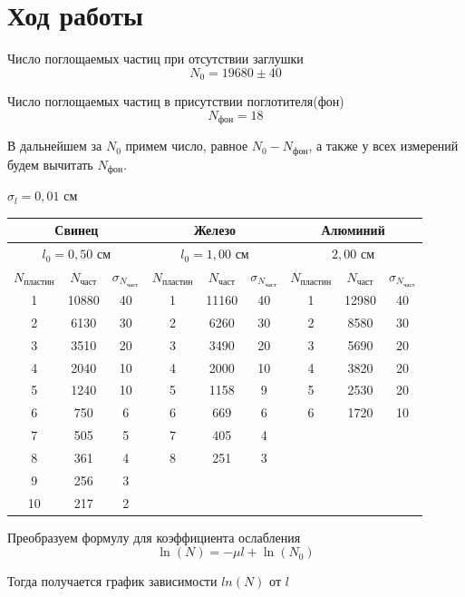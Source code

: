 \documentclass[a4paper,12pt]{article}
\begin{document}
\section*{Ход работы}
Число поглощаемых частиц при отсутствии заглушки
\[N_0 = 19680 \pm 40 \]

Число поглощаемых частиц в присутствии поглотителя(фон)
\[N_\text{фон} = 18\]

В дальнейшем за $N_0$ примем число, равное $N_0 - N_\text{фон}$, а также у всех измерений будем вычитать $N_\text{фон}$.

$\sigma_l = 0,01$ см

\begin{table}[H]
\centering
\begin{tabular}{|c|c|c|c|c|c|c|c|c|}
\hline
\multicolumn{3}{|c|}{Свинец} & \multicolumn{3}{|c|}{Железо} & \multicolumn{3}{|c|}{Алюминий} \\
\hline
\multicolumn{3}{|c|}{$l_0 = 0,50$ см} & \multicolumn{3}{|c|}{$l_0 = 1,00$ см} & \multicolumn{3}{|c|}{$2,00$ см} \\
\hline
$N_\text{пластин}$ & $N_\text{част}$ & $\sigma_{N_\text{част}}$ & $N_\text{пластин}$ & $N_\text{част}$ & $\sigma_{N_\text{част}}$ & $N_\text{пластин}$ & $N_\text{част}$ & $\sigma_{N_\text{част}}$ \\
\hline
1 & 10880 & 40 & 1 & 11160 & 40 & 1 & 12980 & 40 \\
\hline
2 & 6130  & 30 & 2 & 6260 & 30 & 2 & 8580 & 30 \\
\hline
3 & 3510  & 20 & 3 & 3490 & 20 & 3 & 5690 & 20  \\
\hline
4 & 2040  & 10 & 4 & 2000 & 10 & 4 & 3820 & 20  \\
\hline
5 & 1240  & 10 & 5 & 1158 & 9 & 5 & 2530 & 20 \\
\hline
6 & 750   & 6  & 6 & 669 & 6 & 6 & 1720 & 10 \\
\hline
7 & 505   & 5  & 7 & 405 & 4 &   & &       \\
\hline
8 & 361   & 4  & 8 & 251 & 3 &   & & \\
\hline
9 & 256   & 3  &   &     &   &   & & \\
\hline
10 &217  & 2  &    &     &   &   & & \\
\hline
\end{tabular}
\end{table}

\newpage
Преобразуем формулу для коэффициента ослабления
\[\ln(N) = -\mu l + \ln(N_0)\]

Тогда получается график зависимости $ln(N)$ от $l$
\end{document}
